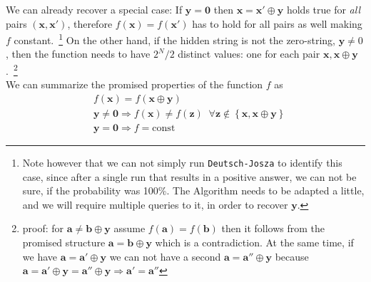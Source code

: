 We can already recover a special case: If $\mathbf{y}=\mathbf{0}$ then $\mathbf{x} = \mathbf{x}' \oplus \mathbf{y}$ holds true for \textit{all} pairs $(\mathbf{x}, \mathbf{x}')$, therefore $f(\mathbf{x})=f(\mathbf{x}')$ has to hold for all pairs as well making $f$ constant.~\footnote{Note however that we can not simply run \texttt{Deutsch-Josza} to identify this case, since after a single run that results in a positive answer, we can not be sure, if the probability was 100\%. The Algorithm needs to be adapted a little, and we will require multiple queries to it, in order to recover $\mathbf{y}$.}
On the other hand, if the hidden string is not the zero-string, $\mathbf{y}\neq 0$, then the function needs to have $2^N/2$ distinct values: one for each pair $\mathbf{x}, \mathbf{x}\oplus \mathbf{y}$.~\footnote{proof: for $\mathbf{a} \neq \mathbf{b} \oplus \mathbf{y}$ assume $f(\mathbf{a})=f(\mathbf{b})$ then it follows from the promised structure $\mathbf{a} = \mathbf{b} \oplus \mathbf
y$ which is a contradiction. At the same time, if we have $\mathbf{a} = \mathbf{a}' \oplus \mathbf{y}$ we can not have a second $\mathbf{a} = \mathbf{a}'' \oplus \mathbf{y}$ because  $\mathbf{a}  = \mathbf{a}' \oplus \mathbf{y}= \mathbf{a}'' \oplus \mathbf{y} \Rightarrow \mathbf{a}'=\mathbf{a}''$ }\\
We can summarize the promised properties of the function $f$ as
\begin{align}
&f(\mathbf{x}) = f(\mathbf{x} \oplus \mathbf{y})\\
&\mathbf{y}\neq\mathbf{0} \Rightarrow f(\mathbf{x}) \neq f(\mathbf{z})\; \; \forall \mathbf{z} \notin \left\{\mathbf{x}, \mathbf{x}\oplus \mathbf{y}\right\}\\
&\mathbf{y}=\mathbf{0} \Rightarrow f=\text{const}
\end{align}


